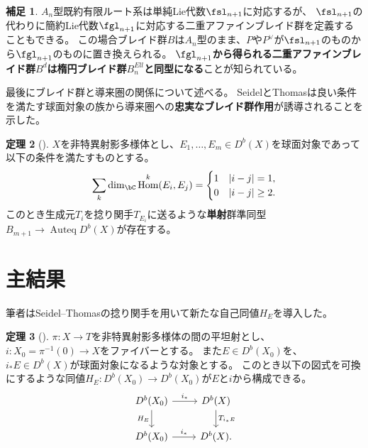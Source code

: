 \documentclass[a4j,uplatex,dvipdfmx]{jsarticle}
\numberwithin{equation}{section}
\numberwithin{figure}{section}
\theoremstyle{definition}
\newtheorem{theorem}{定理}[section]
\newtheorem{remark}[theorem]{補足}
\DeclareMathOperator{\Hom}{\mathrm{Hom}}
\DeclareMathOperator{\Auteq}{\mathrm{Auteq}}
\begin{document}
\begin{remark}\label{remark:gl-braid-group}
    $A_n$型既約有限ルート系は単純Lie代数$\fsl_{n+1}$に対応するが、
    $\fsl_{n+1}$の代わりに簡約Lie代数$\fgl_{n+1}$に対応する二重アファインブレイド群を定義することもできる。
    この場合ブレイド群$B$は$A_n$型のまま、$P$や$P^\vee$が$\fsl_{n+1}$のものから$\fgl_{n+1}$のものに置き換えられる。
    \textbf{$\fgl_{n+1}$から得られる二重アファインブレイド群$B^d$は楕円ブレイド群$B^{Ell}_n$と同型になる}ことが知られている。
\end{remark}


最後にブレイド群と導来圏の関係について述べる。
SeidelとThomasは良い条件を満たす球面対象の族から導来圏への\textbf{忠実なブレイド群作用}が誘導されることを示した\cite{MR1831820}。
\begin{theorem}[\cite{MR1831820}]
    $X$を非特異射影多様体とし、$E_1, \dots, E_m \in D^b(X)$を球面対象であって以下の条件を満たすものとする。
    \begin{equation}
        \sum_k\dim_\bC\Hom^k(E_i, E_j) = \begin{cases}
            1 & |i-j| = 1,    \\
            0 & |i-j| \geq 2.
        \end{cases}
    \end{equation}
    このとき生成元$T_i$を捻り関手$T_{E_i}$に送るような\textbf{単射}群準同型$B_{m+1} \to \Auteq D^b(X)$が存在する。
\end{theorem}




\section{主結果}
筆者はSeidel--Thomasの捻り関手を用いて新たな自己同値$H_E$を導入した。
\begin{theorem}[\cite{2023arXiv230212501A}]
    $\pi \colon X \to T$を非特異射影多様体の間の平坦射とし、$i \colon X_0 = \pi^{-1}(0) \to X$をファイバーとする。
    また$E \in D^b(X_0)$を、$i_*E \in D^b(X)$が球面対象になるような対象とする。
    このとき以下の図式を可換にするような同値$H_E \colon D^b(X_0) \to D^b(X_0)$が$E$と$i$から構成できる。
    \begin{equation}
        \begin{tikzcd}
            D^b(X_0) \arrow[r,"i_*"]\arrow[d, "H_E"'] & D^b(X) \arrow[d,"T_{i_*E}"]\\
            D^b(X_0) \arrow[r, "i_*"]& D^b(X).
        \end{tikzcd}
    \end{equation}
\end{theorem}
\end{document}
